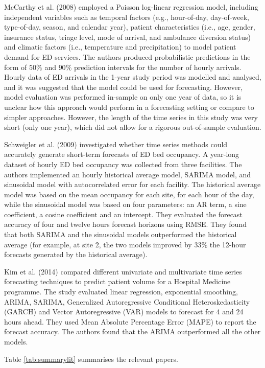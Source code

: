 \documentclass[]{elsarticle} %
\begin{document}
McCarthy et al. (2008) employed a Poisson log-linear regression model,
including independent variables such as temporal factors (e.g.,
hour-of-day, day-of-week, type-of-day, season, and calendar year),
patient characteristics (i.e., age, gender, insurance status, triage
level, mode of arrival, and ambulance diversion status) and climatic
factors (i.e., temperature and precipitation) to model patient demand
for ED services. The authors produced probabilistic predictions in the
form of \(50\%\) and \(90\%\) prediction intervals for the number of hourly
arrivals. Hourly data of ED arrivals in the 1-year study period was
modelled and analysed, and it was suggested that the model could be used
for forecasting. However, model evaluation was performed in-sample on
only one year of data, so it is unclear how this approach would perform
in a forecasting setting or compare to simpler approaches. However, the
length of the time series in this study was very short (only one year),
which did not allow for a rigorous out-of-sample evaluation.

Schweigler et al. (2009) investigated whether time series methods
could accurately generate short-term forecasts of ED bed occupancy. A
year-long dataset of hourly ED bed occupancy was collected from three
facilities. The authors implemented an hourly historical average model,
SARIMA model, and sinusoidal model with autocorrelated error for each
facility. The historical average model was based on the mean occupancy
for each site, for each hour of the day, while the sinusoidal model was
based on four parameters: an AR term, a sine coefficient, a cosine
coefficient and an intercept. They evaluated the forecast accuracy of
four and twelve hours forecast horizons using RMSE. They found that both
SARIMA and the sinusoidal models outperformed the historical average
(for example, at site 2, the two models improved by \(33\%\) the 12-hour
forecasts generated by the historical average).

Kim et al. (2014) compared different univariate and multivariate time
series forecasting techniques to predict patient volume for a Hospital
Medicine programme. The study evaluated linear regression, exponential
smoothing, ARIMA, SARIMA, Generalized Autoregressive Conditional
Heteroskedasticity (GARCH) and Vector Autoregressive (VAR) models to
forecast for 4 and 24 hours ahead. They used Mean Absolute Percentage
Error (MAPE) to report the forecast accuracy. The authors found that the
ARIMA outperformed all the other models.

Table \ref{tab:summarylit} summarises the relevant papers.
\end{document}
